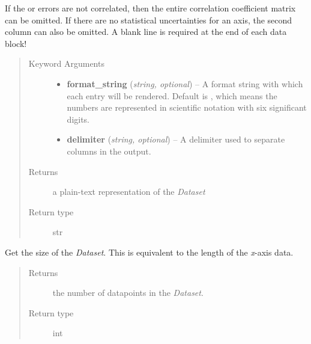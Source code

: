 \documentclass[a4paper,10pt,english]{sphinxmanual}
\begin{document}
\begin{fulllineitems}
\begin{fulllineitems}
If the  or  errors are not correlated, then the entire
correlation coefficient matrix can be omitted. If there are no
statistical uncertainties for an axis, the second column can also be
omitted. A blank line is required at the end of each data block!
\begin{quote}\begin{description}
\item[{Keyword Arguments}] \leavevmode\begin{itemize}
\item {} 
\textbf{format\_string} (\emph{string, optional}) --
A format string with which each entry will be rendered. Default is
, which means the numbers are represented in scientific
notation with six significant digits.

\item {} 
\textbf{delimiter} (\emph{string, optional}) --
A delimiter used to separate columns in the output.

\end{itemize}

\item[{Returns}] \leavevmode
a plain-text representation of the \emph{Dataset}

\item[{Return type}] \leavevmode
str

\end{description}\end{quote}

\end{fulllineitems}


\begin{fulllineitems}
\label{module_doc:kafe.dataset.Dataset.get_size}
Get the size of the \emph{Dataset}. This is equivalent to the length of the
\emph{x}-axis data.
\begin{quote}\begin{description}
\item[{Returns}] \leavevmode
the number of datapoints in the \emph{Dataset}.

\item[{Return type}] \leavevmode
int

\end{description}\end{quote}

\end{fulllineitems}


\end{fulllineitems}
\end{document}
